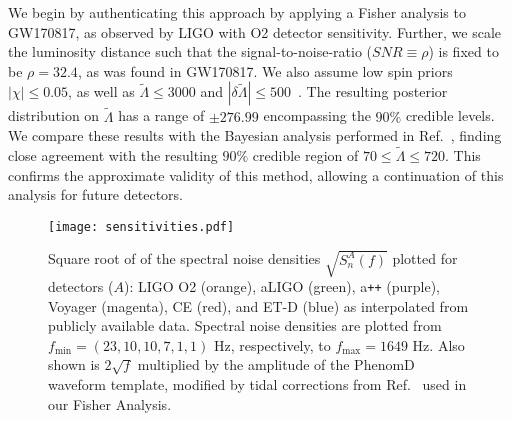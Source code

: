 \documentclass[prd,twocolumn,nofootinbib,superscriptaddress,amsmath,amssymb]{revtex4-1}
\begin{document}
We begin by authenticating this approach by applying a Fisher analysis to GW170817, as observed by LIGO with O2 detector sensitivity.
Further, we scale the luminosity distance such that the signal-to-noise-ratio ($SNR \equiv \rho$) is fixed to be $\rho=32.4$, as was found in GW170817.
We also assume low spin priors $|\chi| \leq 0.05$, as well as $\tilde{\Lambda} \leq 3000$ and $|\delta \tilde{\Lambda}| \leq 500$~\cite{Wade:LambdaPriors}.
The resulting posterior distribution on $\tilde{\Lambda}$ has a range of $\pm 276.99$ encompassing the $90\%$ credible levels.
We compare these results with the Bayesian analysis performed in Ref.~\cite{TheLIGOScientific:2017qsa,Abbott2018}, finding close agreement with the resulting $90\%$ credible region of $70 \leq \tilde{\Lambda} \leq 720$.
This confirms the approximate validity of this method, allowing a continuation of this analysis for future detectors.
\begin{figure}
\begin{center} 
\texttt{[image: sensitivities.pdf]}
\end{center}
\caption{
Square root of of the spectral noise densities $\sqrt{S_n^A(f)}$ plotted for detectors ($A$): LIGO O2 (orange), aLIGO (green), a\texttt{++} (purple), Voyager (magenta), CE (red), and ET-D (blue) as interpolated from publicly available data.
Spectral noise densities are plotted from $f_{\text{min}}=(23,10,10,7,1,1) \text{ Hz}$, respectively, to $f_{\text{max}}=1649 \text{ Hz}$.
Also shown is $2 \sqrt{f}$ multiplied by the amplitude of the PhenomD~\cite{PhenomDI,PhenomDII} waveform template, modified by tidal corrections from Ref.~\cite{Wade:tidalCorrections} used in our Fisher Analysis.
}
\label{fig:sensitivities}
\end{figure}
\end{document}
